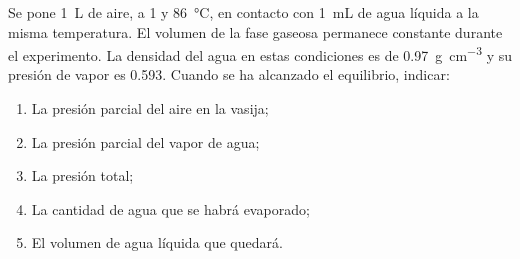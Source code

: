 Se pone \SI{1}{\liter} de aire, a \SI{1}{\atm} y \SI{86}{\celsius}, en contacto con \SI{1}{\milli\liter} de agua líquida a la misma temperatura. El volumen de la fase gaseosa permanece constante durante el experimento. La densidad del agua en estas condiciones es de \SI{0,97}{\gram\per\cubic\centi\meter} y su presión de vapor es \SI{0,593}{\atm}. Cuando se ha alcanzado el equilibrio, indicar:
\begin{enumerate}[label={\alph*)},font={\color{red!50!black}\bfseries}]
	\item La presión parcial del aire en la vasija;
	\item La presión parcial del vapor de agua;
	\item La presión total;
	\item La cantidad de agua que se habrá evaporado;
	\item El volumen de agua líquida que quedará.
\end{enumerate}
